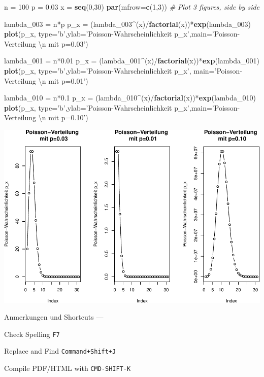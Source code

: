 \documentclass[]{article}
\newenvironment{Shaded}{\begin{snugshade}}{\end{snugshade}}
\newcommand{\KeywordTok}[1]{\textcolor[rgb]{0.13,0.29,0.53}{\textbf{{#1}}}}
\newcommand{\DataTypeTok}[1]{\textcolor[rgb]{0.13,0.29,0.53}{{#1}}}
\newcommand{\DecValTok}[1]{\textcolor[rgb]{0.00,0.00,0.81}{{#1}}}
\newcommand{\FloatTok}[1]{\textcolor[rgb]{0.00,0.00,0.81}{{#1}}}
\newcommand{\CharTok}[1]{\textcolor[rgb]{0.31,0.60,0.02}{{#1}}}
\newcommand{\StringTok}[1]{\textcolor[rgb]{0.31,0.60,0.02}{{#1}}}
\newcommand{\CommentTok}[1]{\textcolor[rgb]{0.56,0.35,0.01}{\textit{{#1}}}}
\newcommand{\NormalTok}[1]{{#1}}
\begin{document}
\newpage

\begin{Shaded}
\begin{Highlighting}[]
\NormalTok{n =}\StringTok{ }\DecValTok{100}
\NormalTok{p =}\StringTok{ }\FloatTok{0.03}
\NormalTok{x =}\StringTok{ }\KeywordTok{seq}\NormalTok{(}\DecValTok{0}\NormalTok{,}\DecValTok{30}\NormalTok{)}
\KeywordTok{par}\NormalTok{(}\DataTypeTok{mfrow=}\KeywordTok{c}\NormalTok{(}\DecValTok{1}\NormalTok{,}\DecValTok{3}\NormalTok{)) }\CommentTok{# Plot 3 figures, side by side}

\NormalTok{lambda_003 =}\StringTok{ }\NormalTok{n*p}
\NormalTok{p_x =}\StringTok{ }\NormalTok{(lambda_003^(x)/}\KeywordTok{factorial}\NormalTok{(x))*}\KeywordTok{exp}\NormalTok{(lambda_003)}
\KeywordTok{plot}\NormalTok{(p_x, }\DataTypeTok{type=}\StringTok{'b'}\NormalTok{,}\DataTypeTok{ylab=}\StringTok{'Poisson-Wahrscheinlichkeit p_x'}\NormalTok{,}\DataTypeTok{main=}\StringTok{'Poisson-Verteilung }\CharTok{\textbackslash{}n}\StringTok{ mit p=0.03'}\NormalTok{)}

\NormalTok{lambda_001 =}\StringTok{ }\NormalTok{n*}\FloatTok{0.01}
\NormalTok{p_x =}\StringTok{ }\NormalTok{(lambda_001^(x)/}\KeywordTok{factorial}\NormalTok{(x))*}\KeywordTok{exp}\NormalTok{(lambda_001)}
\KeywordTok{plot}\NormalTok{(p_x, }\DataTypeTok{type=}\StringTok{'b'}\NormalTok{,}\DataTypeTok{ylab=}\StringTok{'Poisson-Wahrscheinlichkeit p_x'}\NormalTok{, }\DataTypeTok{main=}\StringTok{'Poisson-Verteilung }\CharTok{\textbackslash{}n}\StringTok{ mit p=0.01'}\NormalTok{)}

\NormalTok{lambda_010 =}\StringTok{ }\NormalTok{n*}\FloatTok{0.1}
\NormalTok{p_x =}\StringTok{ }\NormalTok{(lambda_010^(x)/}\KeywordTok{factorial}\NormalTok{(x))*}\KeywordTok{exp}\NormalTok{(lambda_010)}
\KeywordTok{plot}\NormalTok{(p_x, }\DataTypeTok{type=}\StringTok{'b'}\NormalTok{,}\DataTypeTok{ylab=}\StringTok{'Poisson-Wahrscheinlichkeit p_x'}\NormalTok{,}\DataTypeTok{main=}\StringTok{'Poisson-Verteilung }\CharTok{\textbackslash{}n}\StringTok{ mit p=0.10'}\NormalTok{)}
\end{Highlighting}
\end{Shaded}

\includegraphics{Markdown-template_files/figure-latex/unnamed-chunk-3-1.pdf}

\newpage
Anmerkungen und Shortcuts ---

\itemize
\item Check Spelling \texttt{F7} \item Replace and Find
\texttt{Command+Shift+J} \item Compile PDF/HTML with
\texttt{CMD-SHIFT-K}
\end{document}
